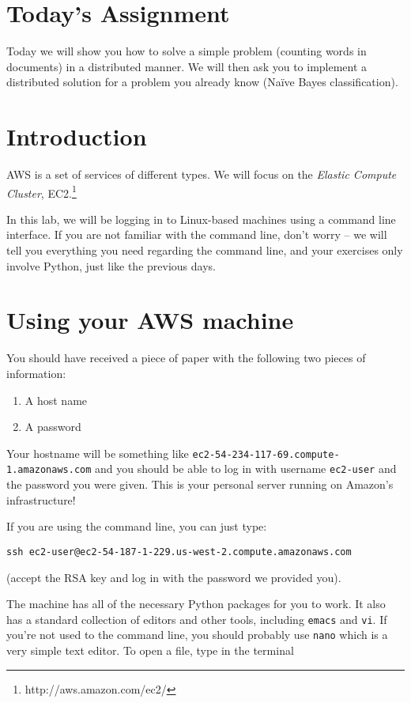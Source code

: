 \section*{Today's Assignment}

Today we will show you how to solve a simple problem (counting words in
documents) in a distributed manner. We will then ask you to implement a
distributed solution for a problem you already know (Na\"{i}ve Bayes
classification).

\iffalse
\section{Introduction}

AWS is a set of services of different types. We will focus on the \emph{Elastic
Compute Cluster}, EC2.\footnote{http://aws.amazon.com/ec2/}

In this lab, we will be logging in to Linux-based machines using a command line
interface. If you are not familiar with the command line, don't worry -- we
will tell you everything you need regarding the command line, and your
exercises only involve Python, just like the previous days.

\section{Using your AWS machine}

You should have received a piece of paper with the following two pieces of information:

\begin{enumerate}
\item A host name
\item A password
\end{enumerate}

Your hostname will be
something like \texttt{ec2-54-234-117-69.compute-1.amazonaws.com} and you
should be able to log in with username \texttt{ec2-user} and the password you
were given. This is your personal server running on Amazon's infrastructure!

If you are using the command line, you can just type:

\begin{verbatim}
ssh ec2-user@ec2-54-187-1-229.us-west-2.compute.amazonaws.com
\end{verbatim}
(accept the RSA key and log in with the password we provided you).

The machine has all of the necessary Python packages for you to work. It also
has a standard collection of editors and other tools, including \texttt{emacs} and \texttt{vi}. If you're not used to the command line, you should probably use \texttt{nano} which is a very simple text editor. To open a file, type in the terminal

